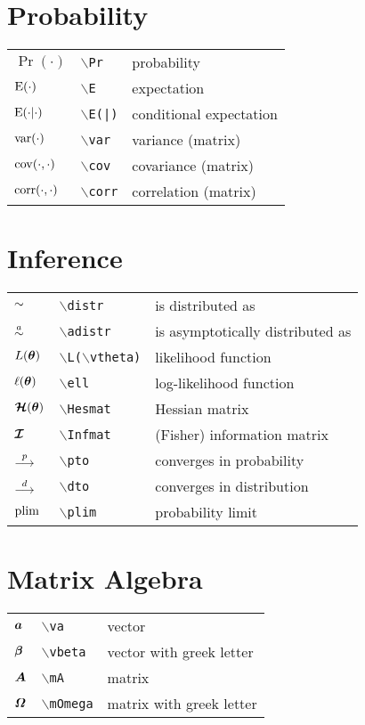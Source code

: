 \documentclass{article}
\newcommand{\type}[1]{{\tt$\backslash$#1}}
\begin{document}
\section{Probability}

\begin{tabular}{ l l l }
$\Pr(\cdot)$         &  \type{Pr}                            & probability \\
$\operatorname{E}(\cdot)$          &  \type{E}                             & expectation \\
$\operatorname{E}(\cdot|\cdot)$    &  \type{E(|)}              & conditional expectation \\
$\operatorname{var}(\cdot)$        &  \type{var}                     & variance (matrix) \\
$\operatorname{cov}(\cdot,\cdot)$  &  \type{cov}                   & covariance (matrix) \\
$\operatorname{corr}(\cdot,\cdot)$ &  \type{corr}                 & correlation (matrix)
\end{tabular}

\section{Inference}

\begin{tabular}{ l l l }
$\sim$             &  \type{distr}                   & is distributed as \\
$\stackrel{a}{\sim}$            &  \type{adistr}   & is asymptotically distributed as \\
$L(\bm \theta)$         &  \type{L(\type{vtheta})}      & likelihood function \\
$\ell(\bm \theta)$      &  \type{ell}               & log-likelihood function \\
$\bm{\mathcal{H}}(\bm \theta)$   &  \type{Hesmat}                     & Hessian matrix \\
$\bm{\mathcal{I}}$            &  \type{Infmat}        & (Fisher) information matrix \\
$\stackrel{p}{\longrightarrow}$               &  \type{pto}              & converges in probability \\
$\stackrel{d}{\longrightarrow}$               &  \type{dto}             & converges in distribution \\
$\operatorname{plim}$              &  \type{plim}                    & probability limit
\end{tabular}

\section{Matrix Algebra}

\begin{tabular}{ l l l }
$\bm a$                &  \type{va}                                 & vector \\
$\bm \beta$             &  \type{vbeta}             & vector with greek letter\\
$\bm A$                &  \type{mA}                                 & matrix \\
$\bm \varOmega$            &  \type{mOmega}           & matrix with greek letter
\end{tabular}
\end{document}
